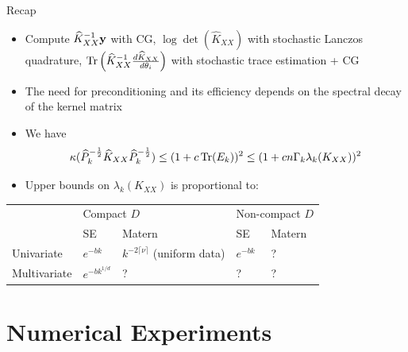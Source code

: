 \documentclass{beamer}
\begin{document}
\begin{frame}{Recap}
\begin{itemize}[<+->]
    \item Compute $\widehat K_{XX}^{-1} \boldsymbol{\mathbf{y}}$ with CG, $\log \det \left( \widehat K_{XX} \right)$ with stochastic Lanczos quadrature, $\operatorname{Tr} \left( \widehat K_{XX}^{-1} \frac{d \widehat K_{XX}}{d\theta_i} \right)$ with stochastic trace estimation + CG
    \item The need for preconditioning and its efficiency depends on the spectral decay of the kernel matrix 
    \item We have
    \begin{equation*}
        \kappa ( \widehat P_k^{-\frac 1 2} \widehat K_{XX} \widehat P_k^{-\frac 1 2} ) \le (1 + c \operatorname{Tr}(E_k))^2 \le ( 1 + c n \Gamma_k \lambda_k(K_{XX}))^2
    \end{equation*}
    \item Upper bounds on $\lambda_k(K_{XX})$ is proportional to:
\end{itemize}
\begin{center}
    \begin{tabular}{l|ll|ll}
    \hline
    {} & \multicolumn{2}{l}{Compact $D$} & \multicolumn{2}{l}{Non-compact $D$} \\
    {} & SE & Matern & SE & Matern \\
    \hline
    Univariate   &       $e^{-bk}$ &           $k^{-2\lceil \nu \rceil}$ {\tiny (uniform data)} &       $e^{-bk}$ &           ? \\
    Multivariate &       $e^{-bk^{1/d}}$ &           ? &       ? &           ? \\
    \hline
    \end{tabular}
\end{center}
\end{frame}


\section{Numerical Experiments}
\end{document}
